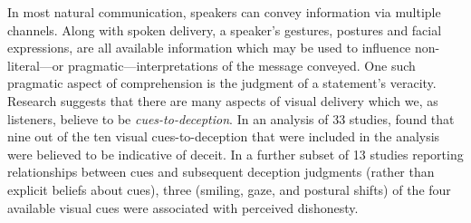 \documentclass[a4paper,man,natbib]{apa6}
\newcommand*{\term}[1]{\emph{#1}} %
\begin{document}
In most natural communication, speakers can convey information via multiple channels.
Along with spoken delivery, a speaker's gestures, postures and facial expressions, are all available information which may be used to influence non-literal---or pragmatic---interpretations of the message conveyed. %
One such pragmatic aspect of comprehension is the judgment of a statement's veracity.
Research suggests that there are many aspects of visual delivery which we, as listeners, believe to be \term{cues-to-deception}. %
In an analysis of 33 studies, \citet{Zuckerman1981} found that nine out of the ten visual cues-to-deception that were included in the analysis were believed to be indicative of deceit. 
In a further subset of 13 studies reporting relationships between cues and subsequent deception judgments (rather than explicit beliefs about cues), three (smiling, gaze, and postural shifts) of the four available visual cues were associated with perceived dishonesty.
\end{document}
